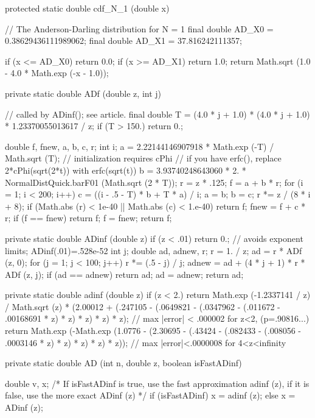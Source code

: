 \begin{code}\begin{hide}
   protected static double cdf_N_1 (double x)
   {
      // The Anderson-Darling distribution for N = 1
      final double AD_X0 = 0.38629436111989062;
      final double AD_X1 = 37.816242111357;

      if (x <= AD_X0)
         return 0.0;
      if (x >= AD_X1)
         return 1.0;
      return Math.sqrt (1.0 - 4.0 * Math.exp (-x - 1.0));
   }

   private static double ADf (double z, int j)
   {                                 // called by ADinf(); see article.
      final double T = (4.0 * j + 1.0) * (4.0 * j + 1.0) * 1.23370055013617 / z;
      if (T > 150.)
         return 0.;

      double f, fnew, a, b, c, r;
      int i;
      a = 2.22144146907918 * Math.exp (-T) / Math.sqrt (T);
      // initialization requires cPhi
      // if you have erfc(), replace 2*cPhi(sqrt(2*t)) with erfc(sqrt(t))
      b = 3.93740248643060 * 2. * NormalDistQuick.barF01 (Math.sqrt (2 * T));
      r = z * .125;
      f = a + b * r;
      for (i = 1; i < 200; i++) {
         c = ((i - .5 - T) * b + T * a) / i;
         a = b;
         b = c;
         r *= z / (8 * i + 8);
         if (Math.abs (r) < 1e-40 || Math.abs (c) < 1.e-40)
            return f;
         fnew = f + c * r;
         if (f == fnew)
            return f;
         f = fnew;
      }
      return f;
   }

   private static double ADinf (double z)
   {
      if (z < .01)
         return 0.;   // avoids exponent limits; ADinf(.01)=.528e-52
      int j;
      double ad, adnew, r;
      r = 1. / z;
      ad = r * ADf (z, 0);
      for (j = 1; j < 100; j++) {
         r *= (.5 - j) / j;
         adnew = ad + (4 * j + 1) * r * ADf (z, j);
         if (ad == adnew) {
            return ad;
         }
         ad = adnew;
      }
      return ad;
   }

   private static double adinf (double z)
   {
      if (z < 2.)
         return Math.exp (-1.2337141 / z) / Math.sqrt (z) * (2.00012 + (.247105 -
               (.0649821 - (.0347962 - (.011672 -
                        .00168691 * z) * z) * z) * z) * z);
      // max |error| < .000002 for z<2, (p=.90816...)
      return
         Math.exp (-Math.exp (1.0776 - (2.30695 - (.43424 - (.082433 -
                     (.008056 - .0003146 * z) * z) * z) * z) * z));
      // max |error|<.0000008 for 4<z<infinity
   }

   private static double AD (int n, double z, boolean isFastADinf)
   {
      double v, x;
      /* If isFastADinf is true, use the fast approximation adinf (z),
         if it is false, use the more exact ADinf (z) */
      if (isFastADinf)
         x = adinf (z);
      else
         x = ADinf (z);

}
\end{hide}
\end{code}
